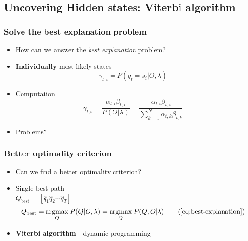 \subsection[Viterbi algorithm]{Uncovering Hidden states: Viterbi algorithm}
\label{sec:viterbi}

\begin{frame}
  \frametitle{Solve the best explanation problem}
  \begin{itemize}
  \item How can we answer the \emph{best explanation} problem?  \pause
  \item \textbf{Individually} most likely states
    \begin{equation}
      \label{eq:individually}
      \gamma_{t,i}=P(q_t = s_i \vert O, \lambda)
    \end{equation}
    \pause
  \item Computation
    \begin{equation}
      \label{eq:gamma_formula}
      \gamma_{t,i}=\frac{\alpha_{t,i}\beta_{t,i}}{P(O\vert \lambda)} =
      \frac{\alpha_{t,i}\beta_{t,i}}{\displaystyle\sum_{k=1}^{N}\alpha_{t,k}\beta_{t,k}}
    \end{equation}
    \pause
  \item Problems?
  \end{itemize}
\end{frame}

\begin{frame}
  \frametitle{Better optimality criterion}
  \begin{itemize}
  \item Can we find a better optimality criterion?  \pause
  \item Single best path \\
    $Q_{\text{best}} = [\hat{q}_1 \hat{q}_2 \cdots \hat{q}_T]$
    \begin{equation}
      Q_{\text{best}} = \underset{Q}{\operatorname{argmax}}\;
      P(Q \vert O, \lambda)
      = \underset{Q}{\operatorname{argmax}}\; P(Q, O \vert \lambda)
      \tag{\ref{eq:best-explanation}}
    \end{equation}
  \item \textbf{Viterbi algorithm} - dynamic programming
  \end{itemize}
\end{frame}

